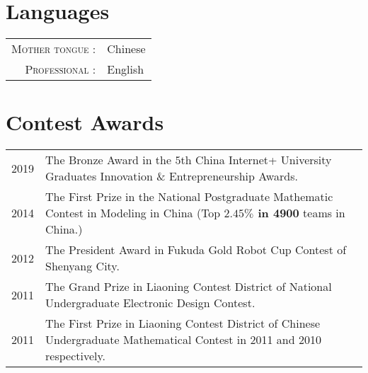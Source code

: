 \documentclass[a4paper,10pt]{article}
\begin{document}

\section{Languages}

\begin{tabular}{rp{10cm}}

  \textsc{Mother tongue :} & Chinese \\

  \textsc{Professional :} & English \\

\end{tabular}



\section{Contest Awards}

\begin{longtable}[H]{r|p{13.5cm}}
  \hspace{20pt} \textsc{2019} & The Bronze Award in the $5$th China Internet+ University Graduates Innovation \& Entrepreneurship Awards. \\
  \textsc{2014} & The First Prize in the National Postgraduate Mathematic Contest in Modeling in China (Top \textbf{$\mathbf{2.45\%}$ in 4900} teams in China.)\\
  \textsc{2012} & The President Award in Fukuda Gold Robot Cup Contest of Shenyang City. \\
  \textsc{2011} & The Grand Prize in Liaoning Contest District of National Undergraduate Electronic Design Contest. \\
  \textsc{2011} & The First Prize in Liaoning Contest District of Chinese Undergraduate Mathematical Contest in 2011 and
                  2010 respectively. \\
\end{longtable}
\end{document}
